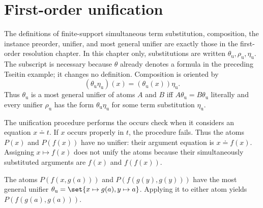 \section{First-order unification}
\label{sec:automated-reasoning-03}

The definitions of finite-support simultaneous term substitution, composition,
the instance preorder, unifier, and most general unifier are exactly those in
the first-order resolution chapter.  In this chapter only, substitutions are
written \(\theta_{\mathrm u},\rho_{\mathrm u},\eta_{\mathrm u}\).  The
subscript is necessary because \(\theta\) already denotes a formula in the
preceding Tseitin example; it changes no definition.  Composition is oriented
by
\[
  (\theta_{\mathrm u}\eta_{\mathrm u})(x)
  =(\theta_{\mathrm u}(x))\eta_{\mathrm u}.
\]
Thus \(\theta_{\mathrm u}\) is a most general unifier of atoms \(A\) and
\(B\) iff \(A\theta_{\mathrm u}=B\theta_{\mathrm u}\) literally and every
unifier \(\rho_{\mathrm u}\) has the form
\(\theta_{\mathrm u}\eta_{\mathrm u}\) for some term substitution
\(\eta_{\mathrm u}\).

The unification procedure performs the occurs check when it considers an
equation \(x\doteq t\).  If \(x\) occurs properly in \(t\), the procedure
fails.  Thus the atoms \(P(x)\) and \(P(f(x))\) have no unifier: their
argument equation is \(x\doteq f(x)\).  Assigning \(x\mapsto f(x)\) does not
unify the atoms because their simultaneously substituted arguments are
\(f(x)\) and \(f(f(x))\).

\begin{example}
The atoms \(P(f(x,g(a)))\) and \(P(f(g(y),g(y)))\) have the most general
unifier
\(\theta_{\mathrm u}=\set{x\mapsto g(a),y\mapsto a}\).  Applying it to
either atom yields \(P(f(g(a),g(a)))\).
\end{example}


